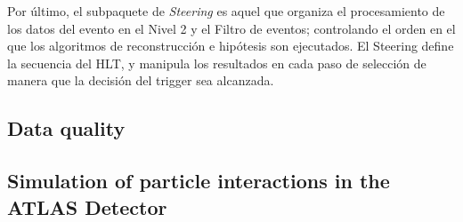   Por \'ultimo, el subpaquete de \emph{Steering} es aquel que organiza el procesamiento de los datos del evento en el Nivel 2 y el Filtro de eventos; controlando el orden en el que los algoritmos de reconstrucci\'on e hip\'otesis son ejecutados. El Steering define la secuencia del HLT, y manipula los resultados en cada paso de selecci\'on de manera que la decisi\'on del trigger sea alcanzada.


\subsection{Data quality}\label{sec:atlasSim}

\subsection{Simulation of particle interactions in the ATLAS Detector}\label{sec:atlasSim}




